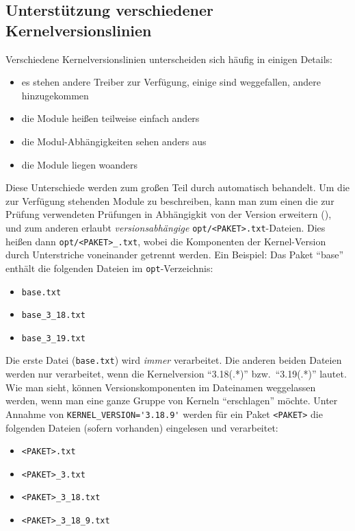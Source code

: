\subsection{Unterstützung verschiedener Kernelversionslinien}

Verschiedene Kernelversionslinien unterscheiden sich häufig in einigen Details:
\begin{itemize}
\item es stehen andere Treiber zur Verfügung, einige sind weggefallen,
  andere hinzugekommen
\item die Module heißen teilweise einfach anders
\item die Modul-Abhängigkeiten sehen anders aus
\item die Module liegen woanders
\end{itemize}

Diese Unterschiede werden zum großen Teil durch 
automatisch behandelt. Um die zur Verfügung stehenden Module zu
beschreiben, kann man zum einen die zur Prüfung verwendeten Prüfungen in
Abhängigkit von der Version erweitern
(), und zum anderen
erlaubt  \emph{versionsabhängige}
\texttt{opt/<PAKET>.txt}-Dateien. Dies heißen dann
\texttt{opt/<PAKET>\_<Kernel-Version>.txt}, wobei die Komponenten der
Kernel-Version durch Unterstriche voneinander getrennt werden. Ein Beispiel:
Das Paket "`base"' enthält die folgenden Dateien im \texttt{opt}-Verzeichnis:

\begin{itemize}
\item \texttt{base.txt}
\item \texttt{base\_3\_18.txt}
\item \texttt{base\_3\_19.txt}
\end{itemize}

Die erste Datei (\texttt{base.txt}) wird \emph{immer} verarbeitet. Die anderen
beiden Dateien werden nur verarbeitet, wenn die Kernelversion "`3.18(.*)"'
bzw.\ "`3.19(.*)"' lautet. Wie man sieht, können Versionskomponenten im Dateinamen
weggelassen werden, wenn man eine ganze Gruppe von Kerneln "`erschlagen"'
möchte. Unter Annahme von \verb+KERNEL_VERSION='3.18.9'+ werden für ein Paket
\texttt{<PAKET>} die folgenden Dateien (sofern vorhanden) eingelesen und
verarbeitet:

\begin{itemize}
\item \texttt{<PAKET>.txt}
\item \texttt{<PAKET>\_3.txt}
\item \texttt{<PAKET>\_3\_18.txt}
\item \texttt{<PAKET>\_3\_18\_9.txt}
\end{itemize}

